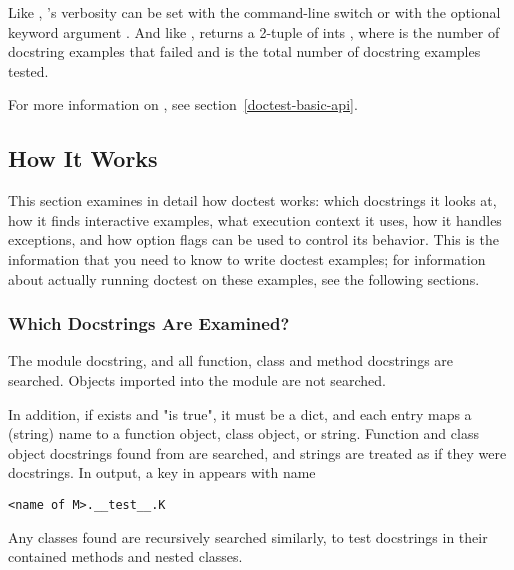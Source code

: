 Like , 's verbosity can be
set with the  command-line switch or with the optional
keyword argument .  And like ,
 returns a 2-tuple of ints
, where
 is the number of docstring examples that failed
and  is the total number of docstring examples tested.

For more information on , see
section~\ref{doctest-basic-api}.

\subsection{How It Works\label{doctest-how-it-works}}

This section examines in detail how doctest works: which docstrings it
looks at, how it finds interactive examples, what execution context it
uses, how it handles exceptions, and how option flags can be used to
control its behavior.  This is the information that you need to know
to write doctest examples; for information about actually running
doctest on these examples, see the following sections.

\subsubsection{Which Docstrings Are Examined?\label{doctest-which-docstrings}}

The module docstring, and all function, class and method docstrings are
searched.  Objects imported into the module are not searched.

In addition, if  exists and "is true", it must be a
dict, and each entry maps a (string) name to a function object, class
object, or string.  Function and class object docstrings found from
 are searched, and strings are treated as if they
were docstrings.  In output, a key  in  appears
with name

\begin{verbatim}
<name of M>.__test__.K
\end{verbatim}

Any classes found are recursively searched similarly, to test docstrings in
their contained methods and nested classes.


